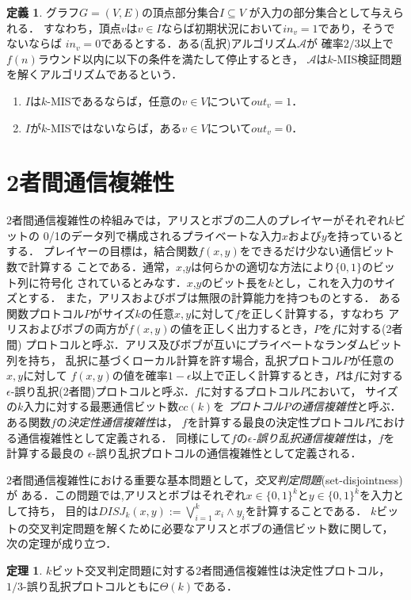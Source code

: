 \documentclass[12pt]{thesis}
\newcommand{\Inp}{\mathit{in}}
\newcommand{\Out}{\mathit{out}}
\theoremstyle{definition}
\newtheorem{theorem}{定理}[chapter]
\newtheorem{definition}{定義}[chapter]
\begin{document}
\begin{definition}
グラフ$G=(V,E)$の頂点部分集合$I \subseteq V$ が入力の部分集合として与えられる．
すなわち，頂点$v$は$v\in I$ならば初期状況において$\Inp_v = 1$であり，そうでないならば
$\Inp_v = 0$であるとする．ある(乱択)アルゴリズム$\mathcal{A}$が
確率$2/3$以上で$f(n)$ラウンド以内に以下の条件を満たして停止するとき，
$\mathcal{A}$は$k$-MIS検証問題を解くアルゴリズムであるという．
\begin{enumerate}
\item $I$は$k$-MISであるならば，任意の$v \in V$について$\Out_v = 1$．
\item $I$が$k$-MISではないならば，ある$v \in V$について$\Out_v = 0$．
\end{enumerate}
\end{definition}

\section{2者間通信複雑性}
2者間通信複雑性の枠組みでは，アリスとボブの二人のプレイヤーがそれぞれ$k$ビットの
0/1のデータ列で構成されるプライベートな入力$x$および$y$を持っているとする．
プレイヤーの目標は，結合関数$f(x,y)$をできるだけ少ない通信ビット数で計算する
ことである．通常，$x$,$y$は何らかの適切な方法により$\{0,1\}$のビット列に符号化
されているとみなす．$x$,$y$のビット長を$k$とし，これを入力のサイズとする．
また，アリスおよびボブは無限の計算能力を持つものとする．
ある関数プロトコル$P$がサイズ$k$の任意$x, y$に対して$f$を正しく計算する，すなわち
アリスおよびボブの両方が$f(x,y)$の値を正しく出力するとき，$P$を$f$に対する(2者間)
プロトコルと呼ぶ．アリス及びボブが互いにプライベートなランダムビット列を持ち，
乱択に基づくローカル計算を許す場合，乱択プロトコル$P$が任意の$x, y$に対して
$f(x,y)$の値を確率$1-\epsilon$以上で正しく計算するとき，$P$は$f$に対する
$\epsilon$-誤り乱択(2者間)プロトコルと呼ぶ．$f$に対するプロトコル$P$において，
サイズの$k$入力に対する最悪通信ビット数$\mathit{cc}(k)$を
\emph{プロトコル$P$の通信複雑性}と呼ぶ．ある関数$f$の\emph{決定性通信複雑性}は，
$f$を計算する最良の決定性プロトコル$P$における通信複雑性として定義される．
同様にして$f$の\emph{$\epsilon$-誤り乱択通信複雑性}は，$f$を計算する最良の
$\epsilon$-誤り乱択プロトコルの通信複雑性として定義される．

2者間通信複雑性における重要な基本問題として，\emph{交叉判定問題}(set-disjointness)が
ある．この問題では,アリスとボブはそれぞれ$x \in \{0, 1\}^{k}$と$y \in \{0, 1\}^{k}$を入力として持ち，
目的は$DISJ_{k} (x, y) :=\bigvee_{i = 1}^{k} x_{i} \land y_{i}$を計算することである．
$k$ビットの交叉判定問題を解くために必要なアリスとボブの通信ビット数に関して，
次の定理が成り立つ\cite{kalyanasundaram1992probabilistic}．
\begin{theorem} \label{thm:disjointness}
$k$ビット交叉判定問題に対する2者間通信複雑性は決定性プロトコル，$1/3$-誤り乱択プロトコルともに$\Theta(k)$である．
\end{theorem}
\end{document}
